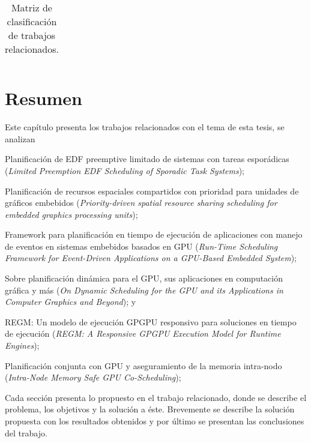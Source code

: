 \begin{table}[h!]
\begin{center}
\begin{tabular}{|m{.7cm}|m{6cm}|m{3cm}|m{2.3cm}|m{2.5cm}|}
                \end{tabular}
        \caption{Matriz de clasificación de trabajos relacionados.}
        \label{tab:table2}
      \end{center}
    \end{table}
    
    
\section{Resumen}
Este capítulo presenta los trabajos relacionados con el tema de esta tesis, se analizan 
\begin{inparaenum}
	\item Planificación de EDF preemptive limitado de sistemas con tareas esporádicas
	 (\textit{Limited Preemption EDF Scheduling of Sporadic Task Systems});
	 \item Planificación de recursos espaciales compartidos con prioridad para unidades de gráficos embebidos 
	 (\textit{Priority-driven spatial resource sharing scheduling for embedded graphics processing units});
	\item Framework para planificación en tiempo de ejecución de aplicaciones con manejo de eventos en sistemas embebidos basados en GPU 
	(\textit{Run-Time Scheduling Framework for Event-Driven Applications on a GPU-Based Embedded System});
	\item Sobre planificación dinámica para el GPU, sus aplicaciones en computación gráfica y más
	(\textit{On Dynamic Scheduling for the GPU and its Applications in Computer Graphics and Beyond}); y
	\item REGM: Un modelo de ejecución GPGPU responsivo para soluciones en tiempo de ejecución
	(\textit{REGM: A Responsive GPGPU Execution Model for Runtime Engines});
    	\item Planificación conjunta con GPU y aseguramiento de la memoria intra-nodo 
	(\textit{Intra-Node Memory Safe GPU Co-Scheduling});
 \end{inparaenum}

\vspace{0.3cm}
Cada sección presenta lo propuesto en el trabajo relacionado, donde se describe el problema, los objetivos y la solución a éste. Brevemente se describe la solución propuesta con los resultados obtenidos y por último se presentan las conclusiones del trabajo.





